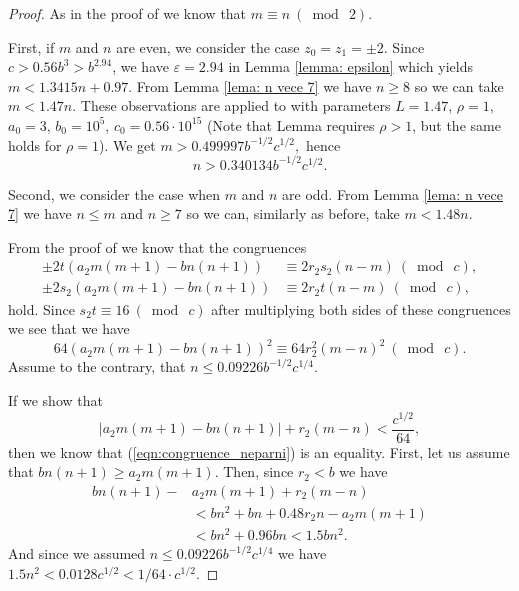 \documentclass[12pt]{amsart}%
\theoremstyle{definition}
\theoremstyle{remark}
\theoremstyle{plain}
\begin{document}
\begin{proof}
    As in the proof of \cite[Lemma 3.1]{mbt} we know that $m\equiv n \ (\bmod \ 2)$. 

    First, if $m$ and $n$ are even, we consider the case $z_0=z_1=\pm 2$. Since $c>0.56b^3>b^{2.94}$, we have $\varepsilon=2.94$ in Lemma \ref{lemma: epsilon} which yields
    $m<1.3415n+0.97.$
From Lemma \ref{lema: n vece 7} we have $n\geq 8$ so we can take
$m<1.47n.$
These observations are applied to \cite[Lemma 4.1]{mbt} with parameters $L=1.47$, $\rho=1$, $a_0=3$, $b_0=10^5$, $c_0=0.56\cdot10^{15}$ (Note that Lemma requires $\rho>1$, but the same holds for $\rho=1$). We get 
$m>0.499997b^{-1/2}c^{1/2},$
hence
$$n>0.340134b^{-1/2}c^{1/2}.$$

Second, we consider the case when $m$ and $n$ are odd. From Lemma \ref{lema: n vece 7} we have $n\leq m$ and $n\geq 7$ so we can, similarly as before, take
$m<1.48n.$

From the proof of \cite[Lemma 13]{fil_xy4} we know that the congruences 
\begin{align}
    \pm 2t(a_2 m(m+1)-bn(n+1))& \equiv 2r_2s_2(n-m)\ (\bmod \ c),\label{cong: prva_nep}\\
    \pm 2s_2(a_2 m(m+1)-bn(n+1))& \equiv 2r_2t(n-m)\ (\bmod \ c)\nonumber,
\end{align}
hold. Since $s_2t\equiv 16\ (\bmod \ c)$ after multiplying both sides of these congruences we see that we have
\begin{equation}\label{eqn:congruence_neparni}
    64(a_2m(m+1)-bn(n+1))^2\equiv 64r_2^2(m-n)^2\ (\bmod \ c).
\end{equation}
Assume to the contrary, that $n\leq 0.09226b^{-1/2}c^{1/4}$. 

If we show that 
$$|a_2m(m+1)-bn(n+1)|+r_2(m-n)<\frac{c^{1/2}}{64},$$
then we know that (\ref{eqn:congruence_neparni}) is an equality.  First, let us assume that $bn(n +1)\geq a_2m(m+1)$. Then, since $r_2<b$ we have
\begin{align*}
    bn(n+1)-&a_2m(m+1)+r_2(m-n)\\
    &<bn^2+bn+0.48r_2n-a_2m(m+1)\\
    &<bn^2+0.96bn<1.5bn^2.
\end{align*}
And since we assumed $n\leq 0.09226b^{-1/2}c^{1/4}$ we have $1.5n^2<0.0128c^{1/2}<1/64\cdot c^{1/2}$. 


\end{proof}
\end{document}
